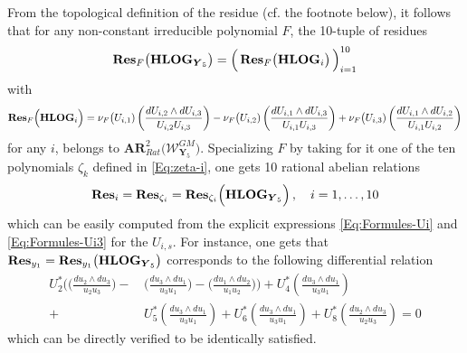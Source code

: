 \documentclass[11pt]{amsart}
\begin{document}
From the topological definition of the residue (cf. the footnote below), it follows that for any non-constant irreducible polynomial $F$, the 10-tuple of residues 
\begin{equation}%
{\bf Res}_F\big( {\bf HLOG}_{\boldsymbol{Y}_5} \big) 
=\Big( \, 
{\bf Res}_F\big( {\bf HLOG}_{i} \big) 
\, 
\Big)_{i=1}^{10}
\end{equation}%
with 
$$
{\bf Res}_F \Big( {\bf HLOG}_i\Big)= 
 \nu_F\big( U_{i,1}) \left( 
\frac{dU_{i,2}\wedge dU_{i,3}}{ U_{i,2}U_{i,3}}
\right)
-
 \nu_F\big( U_{i,2}) \left( 
\frac{dU_{i,1}\wedge dU_{i,3}}{ U_{i,1}U_{i,3}}
\right)
+ \nu_F\big( U_{i,3}) \left( 
\frac{dU_{i,1}\wedge dU_{i,2}}{ U_{i,1}U_{i,2}}
\right)
$$
for any $i$,  belongs to $\boldsymbol{AR}_{Rat}^2\big( \boldsymbol{\mathcal W}_{ \boldsymbol{Y}_5}^{GM}\big)$. Specializing $F$ by taking for it one of the ten polynomials $\zeta_k$ defined in \eqref{Eq:zeta-i}, one gets 10 rational abelian relations
$${\bf Res}_{i}= {\bf Res}_{\zeta_i}=
{\bf Res}_{\zeta_i}\Big( {\bf HLOG}_{ \boldsymbol{Y}_5}\Big)\, , \quad 
i=1,\ldots,10
$$
which can be easily computed from the explicit expressions \eqref{Eq:Formules-Ui} and \eqref{Eq:Formules-Ui3} for the $U_{i,s}$.  For instance, one  gets that ${\bf Res}_{y_1}={\bf Res}_{y_1}\big( {\bf HLOG}_{ \boldsymbol{Y}_5}\big)$ corresponds to the following differential relation
\begin{align}
\label{Eq:Res-y1}
 U_2^*\Bigg( 
\bigg( 
\frac{du_{2}\wedge du_{3}}{ u_{2}u_{3}}
\bigg)-  & \, \bigg( 
\frac{du_{3}\wedge du_{1}}{ u_{3}u_{1}}
\bigg)
-\bigg( 
\frac{du_{1}\wedge du_{2}}{ u_{1}u_{2}}
\bigg)
\Bigg) +U_4^*\left(  
\frac{du_{3}\wedge du_{1}}{ u_{3}u_{1}}
\right) 
\\
+ & \, 
U_5^*\left(  
\frac{du_{3}\wedge du_{1}}{ u_{3}u_{1}}
\right) +
U_6^*\left(  
\frac{du_{3}\wedge du_{1}}{ u_{3}u_{1}}
\right) +
U_8^*\left(  
\frac{du_{2}\wedge du_{3}}{ u_{2}u_{3}}
\right)=0 
\nonumber
\end{align}
which can be directly verified to be  identically satisfied. 
\end{document}
